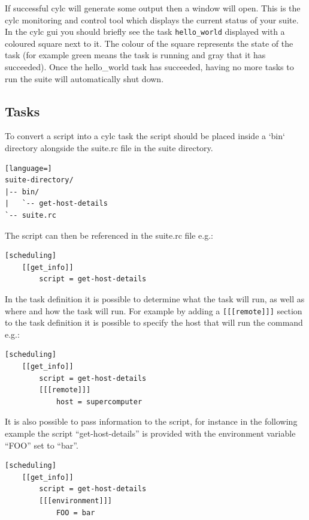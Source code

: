 If successful cylc will generate some output then a window will open. This is
the cylc monitoring and control tool which displays the current status of
your suite. In the cylc gui you should briefly see the task
\lstinline{hello_world}
displayed with a coloured square next to it. The colour of the square
represents the state of the task
(for example green means the task is running and gray that it has succeeded).
Once the hello\_world task has succeeded, having no more tasks to run the suite
will automatically shut down.


\subsection{Tasks}

To convert a script into a cylc task the script should be placed inside a
`bin` directory alongside the suite.rc file in the suite directory.

\begin{lstlisting}[language=]
suite-directory/
|-- bin/
|   `-- get-host-details
`-- suite.rc
\end{lstlisting}

The script can then be referenced in the suite.rc file e.g.:

\begin{lstlisting}[language=suiterc]
[scheduling]
    [[get_info]]
        script = get-host-details
\end{lstlisting}

In the task definition it is possible to determine what the task will run, as
well as where and how the task will run. For example by adding a
\lstinline=[[[remote]]]= section to the task definition it is possible to
specify the host that will run the command e.g.:

\begin{lstlisting}[language=suiterc]
[scheduling]
    [[get_info]]
        script = get-host-details
        [[[remote]]]
            host = supercomputer
\end{lstlisting}

It is also possible to pass information to the script, for instance in the
following example the script ``get-host-details'' is provided with the
environment variable ``FOO'' set to ``bar''.

\begin{lstlisting}[language=suiterc]
[scheduling]
    [[get_info]]
        script = get-host-details
        [[[environment]]]
            FOO = bar
\end{lstlisting}


